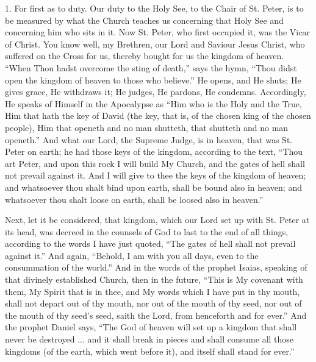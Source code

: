 1. For first as to duty. Our duty to the Holy See, to
the Chair of St. Peter, is to be measured by what the
Church teaches us concerning that Holy See and concerning
him who sits in it. Now St. Peter, who first occupied it,
was the Vicar of Christ. You know well, my Brethren, our
Lord and Saviour Jesus Christ, who suffered on the Cross
for us, thereby bought for us the kingdom of heaven.
``When Thou hadst overcome the sting of death,''
says the hymn, ``Thou didst open the kingdom of
heaven to those who believe.'' He opens, and He
shuts; He gives grace, He withdraws it; He judges, He
pardons, He condemns. Accordingly, He speaks of Himself
in the Apocalypse as ``Him who is the Holy and the
True, Him that hath the key of David (the key, that is,
of the chosen king of the chosen people), Him that
openeth and no man shutteth, that shutteth and no man
openeth.'' And what our Lord, the Supreme Judge, is
in heaven, that was St. Peter on earth; he had those keys
of the kingdom, according to the text, ``Thou art
Peter, and upon this rock I will build My Church, and the
gates of hell shall not prevail against it. And I will
give to thee the keys of the kingdom of heaven; and
whatsoever thou shalt bind upon earth, shall be bound
also in heaven; and whatsoever thou shalt loose on earth,
shall be loosed also in heaven.''

Next, let it be considered, that kingdom, which our
Lord set up with St. Peter at its head, was decreed in
the counsels of God to last to the end of all things,
according to the words I have just quoted, ``The
gates of hell shall not prevail against it.'' And
again, ``Behold, I am with you all days, even to the
consummation of the world.'' And in the words of the
prophet Isaias, speaking of that divinely established
Church, then in the future, ``This is My covenant
with them, My Spirit that is in thee, and My words which
I have put in thy mouth, shall not depart out of thy
mouth, nor out of the mouth of thy seed, nor out of the
mouth of thy seed's seed, saith the Lord, from henceforth
and for ever.'' And the prophet Daniel says, ``The God of heaven will set up a kingdom that shall never
be destroyed ... and it shall break in pieces and shall
consume all those kingdoms (of the earth, which went
before it), and itself shall stand for ever.''


